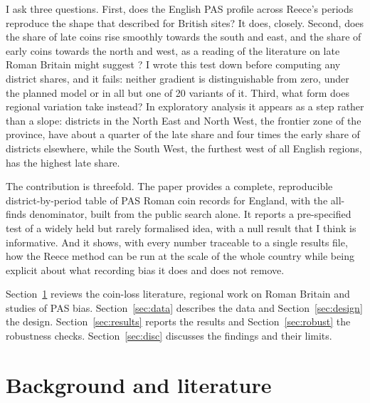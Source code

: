\documentclass[11pt,a4paper]{article}
\begin{document}
I ask three questions. First, does the English PAS profile across Reece's periods reproduce the shape that \citet{reece1995} described for British sites? It does, closely. Second, does the share of late coins rise smoothly towards the south and east, and the share of early coins towards the north and west, as a reading of the literature on late Roman Britain might suggest \citep{esmondecleary1989,walton2012,walton2016}? I wrote this test down before computing any district shares, and it fails: neither gradient is distinguishable from zero, under the planned model or in all but one of 20 variants of it. Third, what form does regional variation take instead? In exploratory analysis it appears as a step rather than a slope: districts in the North East and North West, the frontier zone of the province, have about a quarter of the late share and four times the early share of districts elsewhere, while the South West, the furthest west of all English regions, has the highest late share.

The contribution is threefold. The paper provides a complete, reproducible district-by-period table of PAS Roman coin records for England, with the all-finds denominator, built from the public search alone. It reports a pre-specified test of a widely held but rarely formalised idea, with a null result that I think is informative. And it shows, with every number traceable to a single results file, how the Reece method can be run at the scale of the whole country while being explicit about what recording bias it does and does not remove.

Section~\ref{sec:lit} reviews the coin-loss literature, regional work on Roman Britain and studies of PAS bias. Section~\ref{sec:data} describes the data and Section~\ref{sec:design} the design. Section~\ref{sec:results} reports the results and Section~\ref{sec:robust} the robustness checks. Section~\ref{sec:disc} discusses the findings and their limits.

\section{Background and literature}\label{sec:lit}
\end{document}
